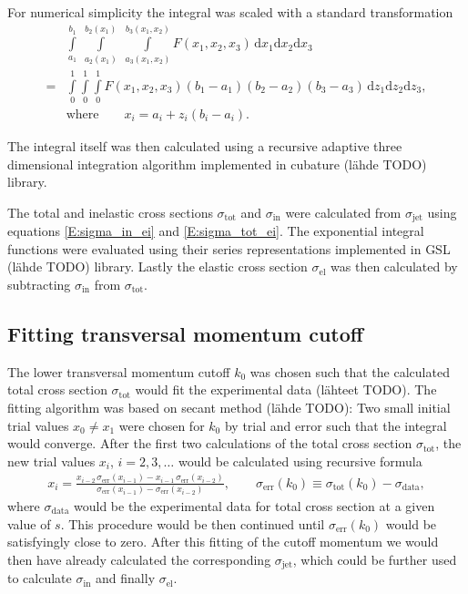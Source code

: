 \documentclass[a4paper, twoside, english, 12pt]{article}
\begin{document}
For numerical simplicity the integral was scaled with a standard transformation
\begin{align}\label{E:integrand_scaling}
	&\int\limits_{a_1}^{b_1} \; \int\limits_{a_2(x_1)}^{b_2(x_1)} \; \int\limits_{a_3(x_1,x_2)}^{b_3(x_1,x_2)} F(x_1,x_2,x_3)\, \text{d}x_1\text{d}x_2\text{d}x_3 \nonumber \\[1em]
	= &\int\limits_{0}^{1}\int\limits_{0}^{1}\int\limits_{0}^{1} F(x_1,x_2,x_3) (b_1-a_1)(b_2-a_2)(b_3-a_3) \, \text{d}z_1\text{d}z_2\text{d}z_3 , \\[1em]
	&\text{where}\qquad x_i = a_i + z_i(b_i-a_i).\nonumber
\end{align}

The integral itself was then calculated using a recursive adaptive three dimensional integration algorithm implemented in cubature (lähde TODO) library.

The total and inelastic cross sections $\sigma_{\text{tot}}$ and $\sigma_{\text{in}}$ were calculated from $\sigma_{\text{jet}}$ using equations \eqref{E:sigma_in_ei} and \eqref{E:sigma_tot_ei}. The exponential integral functions were evaluated using their series representations implemented in GSL (lähde TODO) library. Lastly the elastic cross section $\sigma_{\text{el}}$ was then calculated by subtracting $\sigma_{\text{in}}$ from $\sigma_{\text{tot}}$.



\subsection{Fitting transversal momentum cutoff}\label{SS:fitting}

The lower transversal momentum cutoff $k_0$ was chosen such that the calculated total cross section $\sigma_{\text{tot}}$ would fit the experimental data (lähteet TODO). The fitting algorithm was based on secant method (lähde TODO): Two small initial trial values $x_0\neq x_1$ were chosen for $k_0$ by trial and error such that the integral would converge.  After the first two calculations of the total cross section $\sigma_{\text{tot}}$, the new trial values $x_i$, $i=2,3,\ldots$ would be calculated using recursive formula
\begin{align}
	x_i = \frac{x_{i-2}\,\sigma_{\text{err}}(x_{i-1})-x_{i-1}\,\sigma_{\text{err}}(x_{i-2})}{\sigma_{\text{err}}(x_{i-1})-\sigma_{\text{err}}(x_{i-2})}, \qquad \sigma_{\text{err}}(k_0)\equiv \sigma_{\text{tot}}(k_0)-\sigma_{\text{data}},
\end{align}
where $\sigma_{\text{data}}$ would be the experimental data for total cross section at a given value of $s$. This procedure would be then continued until $\sigma_{\text{err}}(k_0)$ would be satisfyingly close to zero. After this fitting of the cutoff momentum we would then have already calculated the corresponding $\sigma_{\text{jet}}$, which could be further used to calculate $\sigma_{\text{in}}$ and finally $\sigma_{\text{el}}$.
\end{document}
